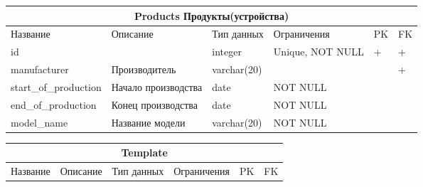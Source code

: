 \documentclass{article}
\begin{document}
\begin{tabular}{ |p{3.5cm}|p{3cm}|p{3cm}|p{3cm}|p{2cm}|p{2cm}|  }
\hline
\multicolumn{6}{|c|}{Products Продукты(устройства)} \\
\hline
Название & Описание & Тип данных & Ограничения & PK & FK\\
\hline
id                  &   %
                    &   %
integer             &   %
Unique, NOT NULL    &   %
 +                  &   %
 +                  \\  %
\hline
manufacturer        &   %
Производитель       &   %
varchar(20)         &   %
                    &   %
                    &   %
 +                  \\  %
\hline
start\_of\_production &   %
Начало производства &   %
date                &   %
NOT NULL            &   %
                    &   %
                    \\  %
\hline
end\_of\_production &   %
Конец производства  &   %
date                &   %
NOT NULL            &   %
                    &   %
                    \\  %
\hline
model\_name         &   %
Название модели     &   %
varchar(20)         &   %
NOT NULL            &   %
                    &   %
                    \\  %
\hline
\end{tabular}


\newpage

\begin{tabular}{ |p{3cm}|p{3cm}|p{3cm}|p{3cm}|p{2cm}|p{2cm}  }
\hline
\multicolumn{6}{|c|}{Template} \\
\hline
Название & Описание & Тип данных & Ограничения & PK & FK\\
\hline
\end{tabular}
\end{document}
